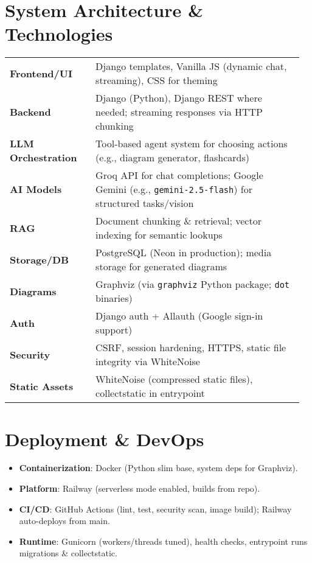 \documentclass[11pt]{article}
\begin{document}
\section*{System Architecture \& Technologies}
\begin{tabular}{p{0.28\linewidth} p{0.68\linewidth}}
\textbf{Frontend/UI} & Django templates, Vanilla JS (dynamic chat, streaming), CSS for theming \\
\textbf{Backend} & Django (Python), Django REST where needed; streaming responses via HTTP chunking \\
\textbf{LLM Orchestration} & Tool-based agent system for choosing actions (e.g., diagram generator, flashcards) \\
\textbf{AI Models} & Groq API for chat completions; Google Gemini (e.g., \texttt{gemini-2.5-flash}) for structured tasks/vision \\
\textbf{RAG} & Document chunking \& retrieval; vector indexing for semantic lookups \\
\textbf{Storage/DB} & PostgreSQL (Neon in production); media storage for generated diagrams \\
\textbf{Diagrams} & Graphviz (via \texttt{graphviz} Python package; \texttt{dot} binaries) \\
\textbf{Auth} & Django auth + Allauth (Google sign-in support) \\
\textbf{Security} & CSRF, session hardening, HTTPS, static file integrity via WhiteNoise \\
\textbf{Static Assets} & WhiteNoise (compressed static files), collectstatic in entrypoint \\
\end{tabular}

\section*{Deployment \& DevOps}
\begin{itemize}
  \item \textbf{Containerization}: Docker (Python slim base, system deps for Graphviz).
  \item \textbf{Platform}: Railway (serverless mode enabled, builds from repo).
  \item \textbf{CI/CD}: GitHub Actions (lint, test, security scan, image build); Railway auto-deploys from main.
  \item \textbf{Runtime}: Gunicorn (workers/threads tuned), health checks, entrypoint runs migrations \& collectstatic.
\end{itemize}
\end{document}
